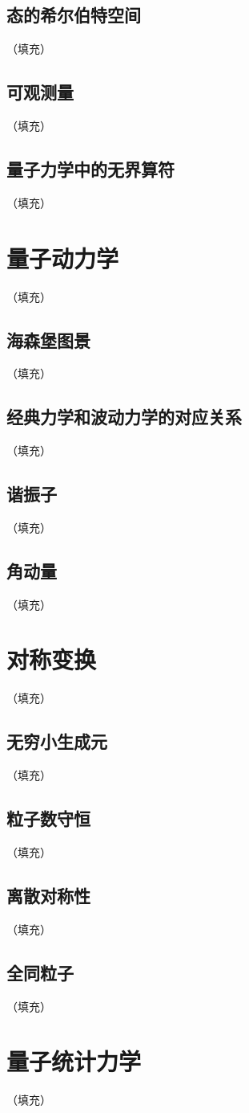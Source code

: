 \documentclass[hyperref,UTF8]{ctexbook}
\begin{document}
\subsection{态的希尔伯特空间}（填充）
\subsection{可观测量}（填充）
\subsection{量子力学中的无界算符}（填充）
\section{量子动力学}（填充）
\subsection{海森堡图景}（填充）
\subsection{经典力学和波动力学的对应关系}（填充）
\subsection{谐振子}（填充）
\subsection{角动量}（填充）
\section{对称变换}（填充）
\subsection{无穷小生成元}（填充）
\subsection{粒子数守恒}（填充）
\subsection{离散对称性}（填充）
\subsection{全同粒子}（填充）
\section{量子统计力学}（填充）
\end{document}
